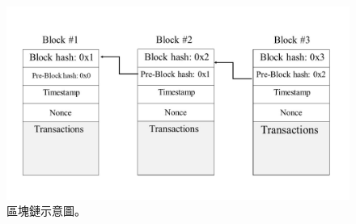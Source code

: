 \begin{figure}[!htbp]
\centering
\includegraphics[scale=0.5]{images/1.jpg}
\caption{區塊鏈示意圖。}
\label{i:byz-latency}
\end{figure}

